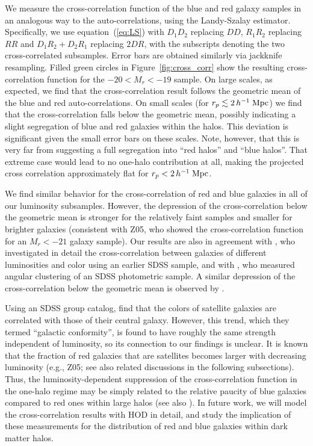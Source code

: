\documentclass[]{emulateapj}
\newcommand{\hmpc}{\,h^{-1}\;{\rm Mpc}}
\begin{document}
We measure the cross-correlation function of the blue and red galaxy
samples in an analogous way to the auto-correlations, using the Landy-Szalay
estimator. Specifically, we use equation~(\ref{eq:LS}) with $D_1D_2$ replacing 
$DD$, $R_1R_2$ replacing $RR$ and $D_1R_2+D_2R_1$ replacing $2DR$, with the
subscripts denoting  the two cross-correlated subsamples. Error bars are
obtained similarly via jackknife resampling. 
%
Filled green circles in 
Figure~\ref{fig:cross_corr} show the resulting cross-correlation function
for the $-20<M_r<-19$ sample.  On large scales, as expected,
we find that the cross-correlation result follows the geometric mean of
the blue and red auto-correlations.  On small scales (for $r_p \lesssim 2\hmpc$)
we find that the cross-correlation falls below the
geometric mean, possibly indicating a slight segregation of blue and red
galaxies within the halos. This deviation is significant given the 
small error bars on these scales.  Note, however, that this is very far
from suggesting a full segregation into ``red halos'' and ``blue halos''.
That extreme case would lead to no one-halo contribution at all, making 
the projected cross correlation approximately flat for $r_p < 2\hmpc$.


We find similar behavior for
the cross-correlation of red and blue galaxies in all of our
luminosity subsamples.
However, the depression of the cross-correlation below the geometric mean
is stronger for the relatively faint samples and smaller 
for brighter galaxies (consistent with Z05, who showed the
cross-correlation function for an $M_r<-21$ galaxy sample). Our results
are also in agreement with \citet{wang07}, who investigated in detail
the cross-correlation between galaxies of different luminosities and
color using an earlier SDSS sample, and with \citet{ross09}, who measured
angular clustering of an SDSS photometric sample.  A similar depression
of the cross-correlation below the geometric mean is observed by 
\citet{coil07}.

Using an SDSS group catalog, \citet{weinmann06} find that the colors
of satellite galaxies are correlated with those of their central galaxy. 
However, this trend, which they
termed ``galactic conformity'', is found to have roughly 
the same strength independent of luminosity, so 
its connection to our findings is unclear.
It is known that the fraction of red galaxies that are satellites becomes
larger with decreasing luminosity (e.g., Z05; see also related discussions
in the following subsections).  Thus, the 
luminosity-dependent suppression of the cross-correlation function in the
one-halo regime may be simply related to the relative paucity of blue 
galaxies compared to red ones within large halos 
(see also \citealt{bosch08b,hansen09}). In future work, we will model the 
cross-correlation results with HOD in detail, and study the implication of 
these measurements
for the distribution of red and blue galaxies within dark matter halos.
\end{document}
